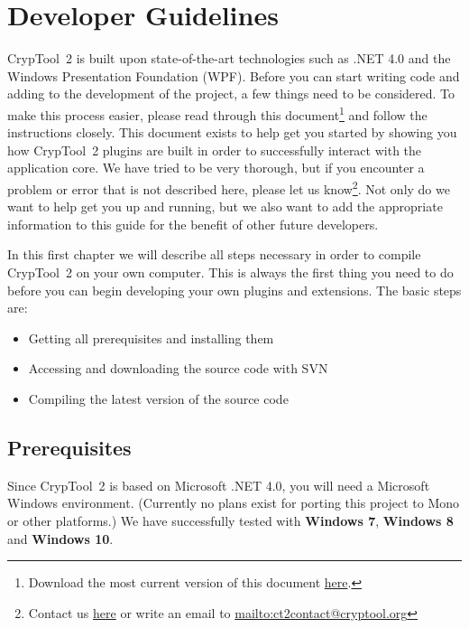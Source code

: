 \chapter{Developer Guidelines}
\label{DeveloperGuidelines}

CrypTool~2 is built upon state-of-the-art technologies such as .NET 4.0 and the Windows Presentation Foundation (WPF). Before you can start writing code and adding to the development of the project, a few things need to be considered. To make this process easier, please read through this document\footnote{Download the most current version of this document \href{https://trac.ct2.cryptool.org/browser/trunk/Documentation/PluginHowTo/HowToDeveloper.pdf}{here}.} and follow the instructions closely. This document exists to help get you started by showing you how CrypTool~2 plugins are built in order to successfully interact with the application core. We have tried to be very thorough, but if you encounter a problem or error that is not described here, please let us know\footnote{Contact us \href{https://trac.ct2.cryptool.org/CrypTool2/wiki/DiscussionGroups}{here} or write an email to \url{mailto:ct2contact@cryptool.org}}. Not only do we want to help get you up and running, but we also want to add the appropriate information to this guide for the benefit of other future developers.

In this first chapter we will describe all steps necessary in order to compile CrypTool~2 on your own computer. This is always the first thing you need to do before you can begin developing your own plugins and extensions. The basic steps are:
\begin{itemize}
	\item Getting all prerequisites and installing them
	\item Accessing and downloading the source code with SVN
	\item Compiling the latest version of the source code
\end{itemize}

\section{Prerequisites}
\label{Prerequisites}

Since CrypTool~2 is based on Microsoft .NET 4.0, you will need a Microsoft Windows environment. (Currently no plans exist for porting this project to Mono or other platforms.) We have successfully tested with \textbf{Windows 7}, \textbf{Windows 8} and \textbf{Windows 10}.

